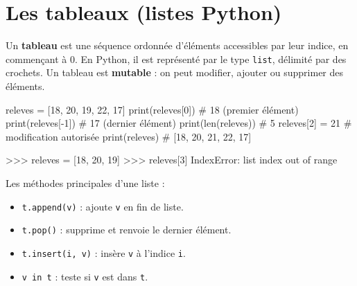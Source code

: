 \section{Les tableaux (listes Python)}
\label{sec:tableaux}


\begin{nxdef}[D4]
  Un \textbf{tableau} est une séquence ordonnée d'éléments accessibles par leur indice,
  en commençant à 0. En Python, il est représenté par le type \lstinline{list},
  délimité par des crochets. Un tableau est \textbf{mutable} : on peut modifier, ajouter
  ou supprimer des éléments.
\end{nxdef}


\begin{python}
releves = [18, 20, 19, 22, 17]
print(releves[0])      # 18  (premier élément)
print(releves[-1])     # 17  (dernier élément)
print(len(releves))    # 5
releves[2] = 21        # modification autorisée
print(releves)         # [18, 20, 21, 22, 17]
\end{python}



\begin{console}
>>> releves = [18, 20, 19]
>>> releves[3]
IndexError: list index out of range
\end{console}


\begin{nxdef}[D5]
  Les méthodes principales d'une liste :
  \begin{itemize}
    \item \lstinline{t.append(v)} : ajoute \lstinline{v} en fin de liste.
    \item \lstinline{t.pop()} : supprime et renvoie le dernier élément.
    \item \lstinline{t.insert(i, v)} : insère \lstinline{v} à l'indice \lstinline{i}.
    \item \lstinline{v in t} : teste si \lstinline{v} est dans \lstinline{t}.
  \end{itemize}
\end{nxdef}

